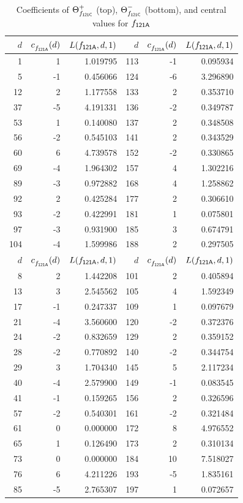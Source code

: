 \begin{table}
\begin{tabular}{||r|rr||r|rr||}
\hline
$d$ & $c^{}_{f_\mathsf{{121A}}}(d)$ & $L(f_\mathsf{{121A}},d,1)$& $d$ & $c^{}_{f_\mathsf{{121A}}}(d)$ & $L(f_\mathsf{{121A}},d,1)$\\
\hline
   1 & 1 & 1.019795 & 113 & -1 & 0.095934 \\
   5 & -1 & 0.456066 & 124 & -6 & 3.296890 \\
   12 & 2 & 1.177558 & 133 & 2 & 0.353710 \\
   37 & -5 & 4.191331 & 136 & -2 & 0.349787 \\
   53 & 1 & 0.140080 & 137 & 2 & 0.348508 \\
   56 & -2 & 0.545103 & 141 & 2 & 0.343529 \\
   60 & 6 & 4.739578 & 152 & -2 & 0.330865 \\
   69 & -4 & 1.964302 & 157 & 4 & 1.302216 \\
   89 & -3 & 0.972882 & 168 & 4 & 1.258862 \\
   92 & 2 & 0.425284 & 177 & 2 & 0.306610 \\
   93 & -2 & 0.422991 & 181 & 1 & 0.075801 \\
   97 & -3 & 0.931900 & 185 & 3 & 0.674791 \\
   104 & -4 & 1.599986 & 188 & 2 & 0.297505 \\
\hline
$d$ & $c^{}_{f_\mathsf{{121A}}}(d)$ & $L(f_\mathsf{{121A}},d,1)$& $d$ & $c^{}_{f_\mathsf{{121A}}}(d)$ & $L(f_\mathsf{{121A}},d,1)$\\
\hline
   8 & 2 & 1.442208 & 101 & 2 & 0.405894 \\
   13 & 3 & 2.545562 & 105 & 4 & 1.592349 \\
   17 & -1 & 0.247337 & 109 & 1 & 0.097679 \\
   21 & -4 & 3.560600 & 120 & -2 & 0.372376 \\
   24 & -2 & 0.832659 & 129 & 2 & 0.359152 \\
   28 & -2 & 0.770892 & 140 & -2 & 0.344754 \\
   29 & 3 & 1.704340 & 145 & 5 & 2.117234 \\
   40 & -4 & 2.579900 & 149 & -1 & 0.083545 \\
   41 & -1 & 0.159265 & 156 & 2 & 0.326596 \\
   57 & -2 & 0.540301 & 161 & -2 & 0.321484 \\
   61 & 0 & 0.000000 & 172 & 8 & 4.976552 \\
   65 & 1 & 0.126490 & 173 & 2 & 0.310134 \\
   73 & 0 & 0.000000 & 184 & 10 & 7.518027 \\
   76 & 6 & 4.211226 & 193 & -5 & 1.835161 \\
   85 & -5 & 2.765307 & 197 & 1 & 0.072657 \\
\hline
\end{tabular}
\caption{Coefficients of
${\Theta}^+_{f_\mathsf{{121C}}}$ (top),
${\Theta}^-_{f_\mathsf{{121C}}}$ (bottom), and central values for $f_\mathsf{{121A}}$
          \label{table:dlcs:121C}}
\end{table}
